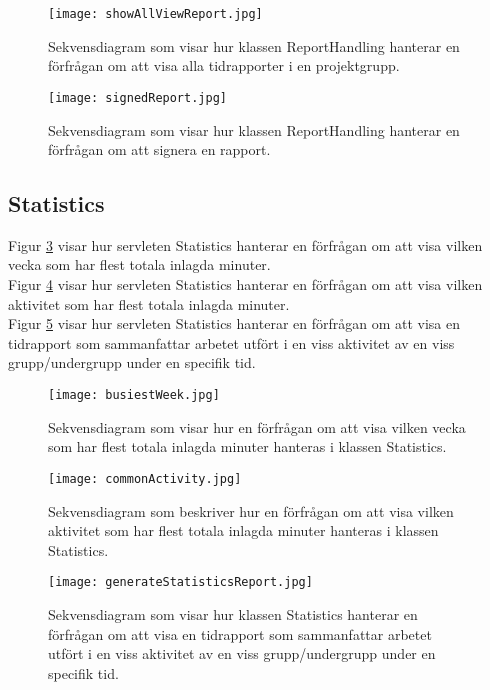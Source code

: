 \documentclass[a4paper]{article}
\begin{document}
\begin{figure}[h!]
\centering
\texttt{[image: showAllViewReport.jpg]}
\caption{Sekvensdiagram som visar hur klassen ReportHandling hanterar en förfrågan om att visa alla tidrapporter i en projektgrupp.
\label{showAllViewReport}}
\end{figure}

\begin{figure}[h!]
\centering
\texttt{[image: signedReport.jpg]}
\caption{Sekvensdiagram som visar hur klassen ReportHandling hanterar en förfrågan om att signera en rapport.
\label{signedReport}}
\end{figure}

\subsection{Statistics}
Figur \ref{busiestWeek} visar hur servleten Statistics hanterar en förfrågan om att visa vilken vecka som har flest totala inlagda minuter.\\
Figur \ref{commonActivity} visar hur servleten Statistics hanterar en förfrågan om att visa vilken aktivitet som har flest totala inlagda minuter.\\
Figur \ref{generateStatisticsReport} visar hur servleten Statistics hanterar en förfrågan om att visa en tidrapport som sammanfattar arbetet utfört i en viss aktivitet av en viss grupp/undergrupp under en specifik tid.

\begin{figure}[h!]
\centering
\texttt{[image: busiestWeek.jpg]}
\caption{Sekvensdiagram som visar hur en förfrågan om att visa vilken vecka som har flest totala inlagda minuter hanteras i klassen Statistics.
\label{busiestWeek}}
\end{figure}

\begin{figure}[h!]
\centering
\texttt{[image: commonActivity.jpg]}
\caption{Sekvensdiagram som beskriver hur en förfrågan om att visa vilken aktivitet som har flest totala inlagda minuter hanteras i klassen Statistics.
\label{commonActivity}}
\end{figure}

\begin{figure}[h!]
\centering
\texttt{[image: generateStatisticsReport.jpg]}
\caption{Sekvensdiagram som visar hur klassen Statistics hanterar en förfrågan om att visa en tidrapport som sammanfattar arbetet utfört i en viss aktivitet av en viss grupp/undergrupp under en specifik tid.
\label{generateStatisticsReport}}
\end{figure}
\end{document}
